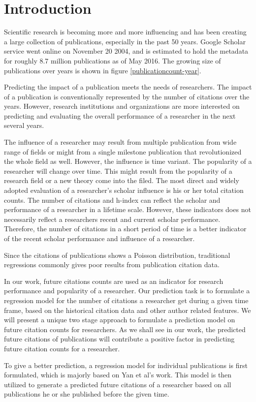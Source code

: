 \section{Introduction}
Scientific research is becoming more and more influencing and has been creating a large collection of publications, especially in the past 50 years.
Google Scholar service went online on November 20 2004, and is estimated to hold the metadata for roughly 8.7 million publications as of May 2016\cite{}.
The growing size of publications over years is shown in figure \ref{publicationcount-year}.

Predicting the impact of a publication meets the needs of researchers. The impact of a publication is conventionally represented by the number of citations over the years.
However, research institutions and organizations are more interested on predicting and evaluating the overall performance of a researcher in the next several years.

The influence of a researcher may result from multiple publication from wide range of fields or might from a single milestone publication that revolutionized the whole field as well. However, the influence is time variant. The popularity of a researcher will change over time. This might result from the popularity of a research field or a new theory come into the filed.
The most direct and widely adopted evaluation of a researcher's scholar influence is his or her total citation counts. The number of citations and h-index can reflect the scholar and performance of a researcher in a lifetime scale\cite{bornmann2007we}. However, these indicators does not necessarily reflect a researchers recent and current scholar performance. Therefore, the number of citations in a short period of time is a better indicator of the recent scholar performance and influence of a researcher.

Since the citations of publications shows a Poisson distribution, traditional regressions commonly gives poor results from publication citation data\cite{cheng2014can,radicchi2008universality}. 

In our work, future citations counts are used as an indicator for research performance and popularity of a researcher. Our prediction task is to formulate a regression model for the number of citations a researcher get during a given time frame, based on the historical citation data and other author related features. We will present a unique two stage approach to formulate a prediction model on future citation counts for researchers. As we shall see in our work, the predicted future citations of publications will contribute a positive factor in predicting future citation counts for a researcher.

To give a better prediction, a regression model for individual publications is first formulated, which is majorly based on Yan et al's work\cite{yan2011citation}. This model is then utilized to generate a predicted future citations of a researcher based on all publications he or she published before the given time.
